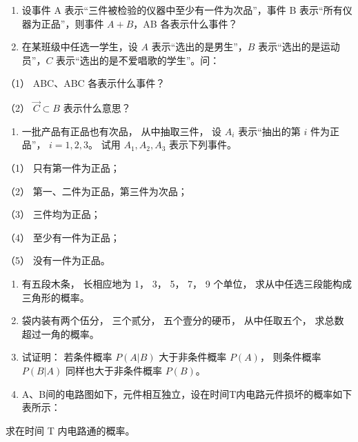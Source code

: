 \begin{enumerate}[start=2]
\item
  设事件 A 表示``三件被检验的仪器中至少有一件为次品''，事件 B
  表示``所有仪器为正品''，则事件 \(A + B\)，AB 各表示什么事件？
\item
  在某班级中任选一学生，设 \(A\) 表示``选出的是男生''，\(B\)
  表示``选出的是运动员''，\(C\) 表示``选出的是不爱唱歌的学生''。问：
\end{enumerate}

（1） ABC、ABC 各表示什么事件？

（2） \(\vec{C} \subset B\) 表示什么意思？

\begin{enumerate}[start=4]
\item
  一批产品有正品也有次品， 从中抽取三件， 设 \(A_{i}\) 表示``抽出的第
  \(i\) 件为正品''， \(i = 1, 2, 3\)。 试用 \(A_{1}, A_{2}, A_{3}\)
  表示下列事件。
\end{enumerate}

（1） 只有第一件为正品；

（2） 第一、二件为正品，第三件为次品；

（3） 三件均为正品；

（4） 至少有一件为正品；

（5） 没有一件为正品。

\begin{enumerate}[start=5]
\item
  有五段木条， 长相应地为 1， 3， 5， 7， 9 个单位，
  求从中任选三段能构成三角形的概率。
\item
  袋内装有两个伍分， 三个贰分， 五个壹分的硬币， 从中任取五个，
  求总数超过一角的概率。
\item
  试证明： 若条件概率 \(P(A|B)\) 大于非条件概率 \(P(A)\)， 则条件概率
  \(P(B|A)\) 同样也大于非条件概率 \(P(B)\)。
\item
  A、B间的电路图如下，元件相互独立，设在时间T内电路元件损坏的概率如下表所示：
\end{enumerate}

{\centering
\small\setlength{\tabcolsep}{3pt}%
\par
}

求在时间 T 内电路通的概率。

